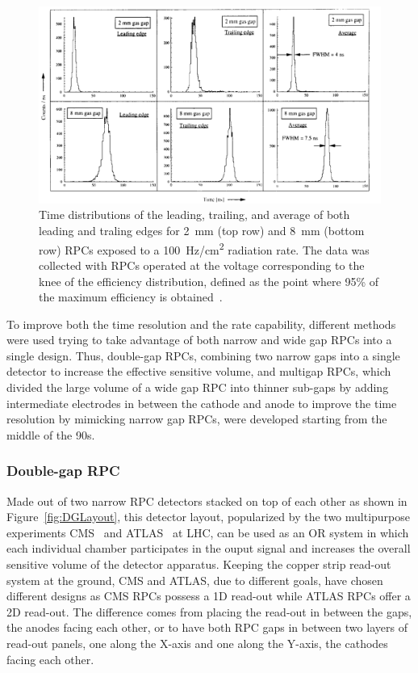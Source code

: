 	\begin{figure}[H]
		\centering
		\includegraphics[width = \linewidth]{fig/chapt4/Time-res-gap-width.png}
		\caption{\label{fig:GapWidthTime} Time distributions of the leading, trailing, and average of both leading and traling edges for \SI{2}{mm} (top row) and \SI{8}{mm} (bottom row) RPCs exposed to a \SI{100}{Hz/cm^2} radiation rate. The data was collected with RPCs operated at the voltage corresponding to the knee of the efficiency distribution, defined as the point where 95\% of the maximum efficiency is obtained~\cite{ZEBALLOS96COMP}.}
	\end{figure}
	
	To improve both the time resolution and the rate capability, different methods were used trying to take advantage of both narrow and wide gap RPCs into a single design. Thus, double-gap RPCs, combining two narrow gaps into a single detector to increase the effective sensitive volume, and multigap RPCs, which divided the large volume of a wide gap RPC into thinner sub-gaps by adding intermediate electrodes in between the cathode and anode to improve the time resolution by mimicking narrow gap RPCs, were developed starting from the middle of the 90s.
	
		\subsubsection{Double-gap RPC}
		\label{chapt4:sssec:DGRPC}
	
	Made out of two narrow RPC detectors stacked on top of each other as shown in Figure~\ref{fig:DGLayout}, this detector layout, popularized by the two multipurpose experiments CMS~\cite{MUONTDR} and ATLAS~\cite{ATLASTDR} at LHC, can be used as an OR system in which each individual chamber participates in the ouput signal and increases the overall sensitive volume of the detector apparatus. Keeping the copper strip read-out system at the ground, CMS and ATLAS, due to different goals, have chosen different designs as CMS RPCs possess a 1D read-out while ATLAS RPCs offer a 2D read-out. The difference comes from placing the read-out in between the gaps, the anodes facing each other, or to have both RPC gaps in between two layers of read-out panels, one along the X-axis and one along the Y-axis, the cathodes facing each other.
	
